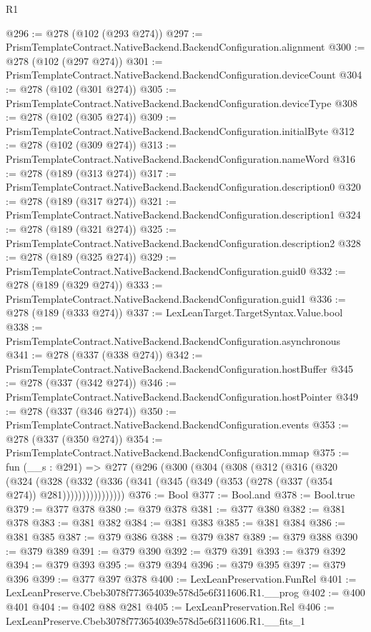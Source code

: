 \begin{lexlean}{R1}
\begin{coremodule}
@296 := @278 (@102 (@293 @274))
@297 := PrismTemplateContract.NativeBackend.BackendConfiguration.alignment
@300 := @278 (@102 (@297 @274))
@301 := PrismTemplateContract.NativeBackend.BackendConfiguration.deviceCount
@304 := @278 (@102 (@301 @274))
@305 := PrismTemplateContract.NativeBackend.BackendConfiguration.deviceType
@308 := @278 (@102 (@305 @274))
@309 := PrismTemplateContract.NativeBackend.BackendConfiguration.initialByte
@312 := @278 (@102 (@309 @274))
@313 := PrismTemplateContract.NativeBackend.BackendConfiguration.nameWord
@316 := @278 (@189 (@313 @274))
@317 := PrismTemplateContract.NativeBackend.BackendConfiguration.description0
@320 := @278 (@189 (@317 @274))
@321 := PrismTemplateContract.NativeBackend.BackendConfiguration.description1
@324 := @278 (@189 (@321 @274))
@325 := PrismTemplateContract.NativeBackend.BackendConfiguration.description2
@328 := @278 (@189 (@325 @274))
@329 := PrismTemplateContract.NativeBackend.BackendConfiguration.guid0
@332 := @278 (@189 (@329 @274))
@333 := PrismTemplateContract.NativeBackend.BackendConfiguration.guid1
@336 := @278 (@189 (@333 @274))
@337 := LexLeanTarget.TargetSyntax.Value.bool
@338 := PrismTemplateContract.NativeBackend.BackendConfiguration.asynchronous
@341 := @278 (@337 (@338 @274))
@342 := PrismTemplateContract.NativeBackend.BackendConfiguration.hostBuffer
@345 := @278 (@337 (@342 @274))
@346 := PrismTemplateContract.NativeBackend.BackendConfiguration.hostPointer
@349 := @278 (@337 (@346 @274))
@350 := PrismTemplateContract.NativeBackend.BackendConfiguration.events
@353 := @278 (@337 (@350 @274))
@354 := PrismTemplateContract.NativeBackend.BackendConfiguration.mmap
@375 := fun (__s : @291) =>
  @277
    (@296
      (@300
        (@304
          (@308
            (@312
              (@316
                (@320
                  (@324
                    (@328
                      (@332
                        (@336 (@341 (@345 (@349 (@353 (@278 (@337 (@354 @274)) @281))))))))))))))))
@376 := Bool
@377 := Bool.and
@378 := Bool.true
@379 := @377 @378
@380 := @379 @378
@381 := @377 @380
@382 := @381 @378
@383 := @381 @382
@384 := @381 @383
@385 := @381 @384
@386 := @381 @385
@387 := @379 @386
@388 := @379 @387
@389 := @379 @388
@390 := @379 @389
@391 := @379 @390
@392 := @379 @391
@393 := @379 @392
@394 := @379 @393
@395 := @379 @394
@396 := @379 @395
@397 := @379 @396
@399 := @377 @397 @378
@400 := LexLeanPreservation.FunRel
@401 := LexLeanPreserve.Cbeb3078f773654039e578d5e6f311606.R1.__prog
@402 := @400 @401
@404 := @402 @88 @281
@405 := LexLeanPreservation.Rel
@406 := LexLeanPreserve.Cbeb3078f773654039e578d5e6f311606.R1.__fits_1

\end{coremodule}
\end{lexlean}

